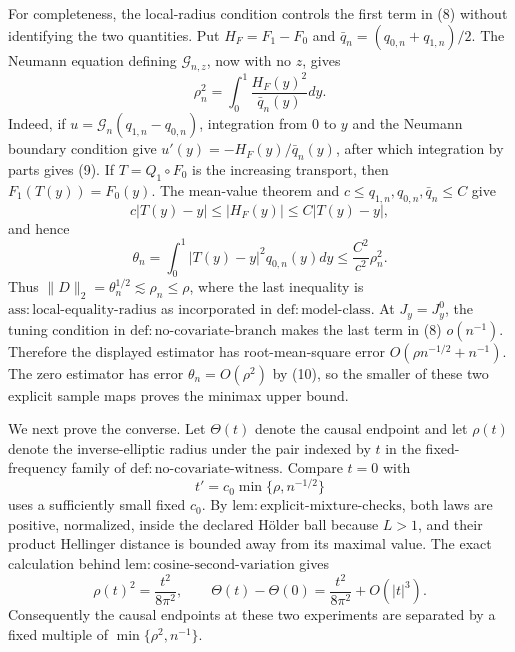 For completeness, the local-radius condition controls the first term in (8) without identifying the two quantities. Put \(H_F=F_1-F_0\) and \(\bar q_n=(q_{0,n}+q_{1,n})/2\). The Neumann equation defining \(\mathcal G_{n,z}\), now with no \(z\), gives
\[
\rho_n^2=\int_0^1\frac{H_F(y)^2}{\bar q_n(y)}dy. \tag{9}
\]
Indeed, if \(u=\mathcal G_n(q_{1,n}-q_{0,n})\), integration from \(0\) to \(y\) and the Neumann boundary condition give \(u'(y)=-H_F(y)/\bar q_n(y)\), after which integration by parts gives (9). If \(T=Q_1\circ F_0\) is the increasing transport, then \(F_1(T(y))=F_0(y)\). The mean-value theorem and \(c\le q_{1,n},q_{0,n},\bar q_n\le C\) give
\[
c|T(y)-y|\le|H_F(y)|\le C|T(y)-y|,
\]
and hence
\[
\theta_n=\int_0^1|T(y)-y|^2q_{0,n}(y)dy
\le \frac{C^2}{c^2}\rho_n^2. \tag{10}
\]
Thus \(\|D\|_2=\theta_n^{1/2}\lesssim\rho_n\le\rho\), where the last inequality is \(\mathrm{ass{:}local\text{-}equality\text{-}radius}\) as incorporated in \(\mathrm{def{:}model\text{-}class}\). At \(J_y=J_y^0\), the tuning condition in \(\mathrm{def{:}no\text{-}covariate\text{-}branch}\) makes the last term in (8) \(o(n^{-1})\). Therefore the displayed estimator has root-mean-square error \(O(\rho n^{-1/2}+n^{-1})\). The zero estimator has error \(\theta_n=O(\rho^2)\) by (10), so the smaller of these two explicit sample maps proves the minimax upper bound.

We next prove the converse. Let \(\Theta(t)\) denote the causal endpoint and let \(\rho(t)\) denote the inverse-elliptic radius under the pair indexed by \(t\) in the fixed-frequency family of \(\mathrm{def{:}no\text{-}covariate\text{-}witness}\). Compare \(t=0\) with
\[
t'=c_0\min\{\rho,n^{-1/2}\}
\]
uses a sufficiently small fixed \(c_0\). By \(\mathrm{lem{:}explicit\text{-}mixture\text{-}checks}\), both laws are positive, normalized, inside the declared H\"older ball because \(L>1\), and their product Hellinger distance is bounded away from its maximal value. The exact calculation behind \(\mathrm{lem{:}cosine\text{-}second\text{-}variation}\) gives
\[
\rho(t)^2=\frac{t^2}{8\pi^2},
\qquad
\Theta(t)-\Theta(0)=\frac{t^2}{8\pi^2}+O(|t|^3). \tag{11}
\]
Consequently the causal endpoints at these two experiments are separated by a fixed multiple of \(\min\{\rho^2,n^{-1}\}\).

